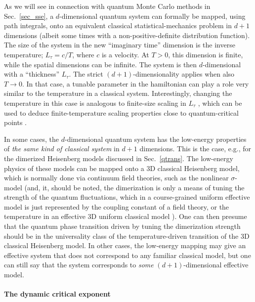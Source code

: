\documentclass[draft,numberedheadings]{aipproc}
\begin{document}
As we will see in connection with quantum Monte Carlo methods in Sec.~\ref{sec_sse}, a $d$-dimensional quantum system can formally be mapped, 
using path integrals, onto an equivalent classical statistical-mechanics problem in $d+1$ dimensions (albeit some times with a non-positive-definite 
distribution function). The size of the system in the new ``imaginary time'' dimension is the inverse temperature; $L_\tau=c/T$, where $c$ is a velocity. 
At $T>0$, this dimension is finite, while the spatial dimensions can be infinite. The system is then $d$-dimensional with a ``thickness'' 
$L_\tau$. The strict $(d+1)$-dimensionality applies when also $T\to 0$. In that case, a tunable parameter in the hamiltonian can play a role very similar 
to the temperature in a classical system. Interestingly, changing the temperature in this case is analogous to finite-size scaling in $L_\tau$ \cite{chn}, 
which can be used to deduce finite-temperature scaling properties close to quantum-critical points \cite{chubukov}.

In some cases, the $d$-dimensional quantum system has the low-energy properties of {\it the same kind of classical system} in $d+1$ dimensions. This 
is the case, e.g., for the dimerized Heisenberg models discussed in Sec.~\ref{qtrans}. The low-energy physics of these models can 
be mapped onto a 3D classical Heisenberg model, which is normally done via continuum field theories, such as the nonlinear $\sigma$-model 
\cite{chn,chubukov} (and, it, should be noted, the dimerization is only a means of tuning the strength of the quantum fluctuations, which in a 
course-grained uniform effective model is just represented by the coupling constant of a field theory, or the temperature in an effective 3D 
uniform classical model \cite{vojta04}). One can then presume that the quantum phase transition driven by tuning the dimerization strength should be 
in the universality class of the temperature-driven transition of the 3D classical Heisenberg model. In other cases, the low-energy mapping may give an 
effective system that does not correspond to any familiar classical model, but one can still say that the system corresponds to {\it some} $(d+1)$-dimensional 
effective model.

\paragraph{The dynamic critical exponent}
\end{document}
